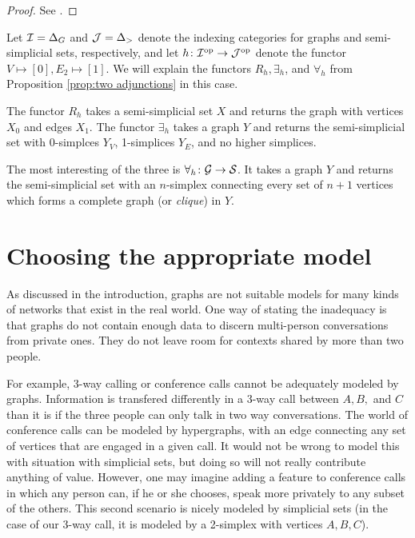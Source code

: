 \documentclass{amsart}
\begin{document}
\begin{proof}

See \cite[7.2.2]{MM}.

\end{proof}

\begin{example}

Let $\mathcal{I}=\Delta_G$ and $\mathcal{J}=\Delta_>$ denote the indexing categories for graphs and semi-simplicial sets, respectively, and let $h\colon\mathcal{I}^\textnormal{op}\rightarrow\mathcal{J}^\textnormal{op}$ denote the functor $V\mapsto [0], E_2\mapsto [1]$.  We will explain the functors $R_h,\exists_h$, and $\forall_h$ from Proposition \ref{prop:two adjunctions} in this case.

The functor $R_h$ takes a semi-simplicial set $X$ and returns the graph with vertices $X_0$ and edges $X_1$.  The functor $\exists_h$ takes a graph $Y$ and returns the semi-simplicial set with $0$-simplces $Y_V$, 1-simplices $Y_E$, and no higher simplices.  

The most interesting of the three is $\forall_h\colon\mathcal{G}\rightarrow\mathcal{S}$.  It takes a graph $Y$ and returns the semi-simplicial set with an $n$-simplex connecting every set of $n+1$ vertices which forms a complete graph (or {\em clique}) in $Y$.  
  
\end{example}

\section{Choosing the appropriate model}\label{sec:choosing}

As discussed in the introduction, graphs are not suitable models for many kinds of networks that exist in the real world.  One way of stating the inadequacy is that graphs do not contain enough data to discern multi-person conversations from private ones.  They do not leave room for contexts shared by more than two people.  

For example, 3-way calling or conference calls cannot be adequately modeled by graphs.  Information is transfered differently in a 3-way call between $A, B,$ and $C$ than it is if the three people can only talk in two way conversations.  The world of conference calls can be modeled by hypergraphs, with an edge connecting any set of vertices that are engaged in a given call.  It would not be wrong to model this with situation with simplicial sets, but doing so will not really contribute anything of value.  However, one may imagine adding a feature to conference calls in which any person can, if he or she chooses, speak more privately to any subset of the others.  This second scenario is nicely modeled by simplicial sets (in the case of our 3-way call, it is modeled by a 2-simplex with vertices $A,B,C$).
\end{document}
